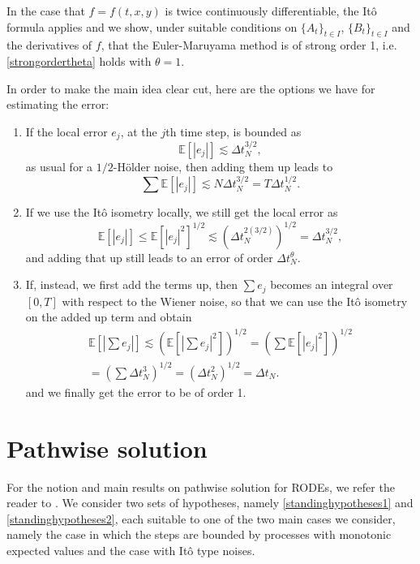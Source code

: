 \documentclass[reqno,12pt]{amsart}
\theoremstyle{plain}%
\theoremstyle{definition}
\begin{document}
In the case that $f=f(t, x, y)$ is twice continuously differentiable, the It\^o formula applies and we show, under suitable conditions on $\{A_t\}_{t\in I}$, $\{B_t\}_{t\in I}$ and the derivatives of $f$, that the Euler-Maruyama method is of strong order 1, i.e. \eqref{strongordertheta} holds with $\theta=1$.

In order to make the main idea clear cut, here are the options we have for estimating the error:
\begin{enumerate}
  \item If the local error $e_j$, at the $j$th time step, is bounded as
    $$
    \mathbb{E}[|e_j|] \lesssim \Delta t_N^{3/2},
    $$
    as usual for a $1/2$-H\"older noise, then adding them up leads to 
    $$
      \sum \mathbb{E}[|e_j|] \lesssim N\Delta t_N^{3/2} = T\Delta t_N^{1/2}.
    $$
    \item If we use the It\^o isometry locally, we still get the local error as
    $$
      \mathbb{E}[|e_j|] \leq \mathbb{E}[|e_j|^2]^{1/2} \lesssim \left(\Delta t_N^{2(3/2)} \right)^{1/2} = \Delta t_N^{3/2},
    $$
    and adding that up still leads to an error of order $\Delta t_N^{\theta}$.
    \item If, instead, we first add the terms up, then $\sum e_j$ becomes an integral over $[0, T]$ with respect to the Wiener noise, so that we can use the It\^o isometry on the added up term and obtain
    \begin{multline*}
      \mathbb{E}\left[ \left| \sum e_j \right| \right] \lesssim \left(\mathbb{E}\left[ \left| \sum e_j \right|^2 \right]\right)^{1/2} = \left( \sum \mathbb{E}[|e_j|^2] \right)^{1/2} \\
      = \left( \sum \Delta t_N^3 \right)^{1/2} = \left( \Delta t_N^2 \right)^{1/2} = \Delta t_N.
    \end{multline*}
    and we finally get the error to be of order 1.
\end{enumerate}

\section{Pathwise solution}
\label{secpathwisesolution}

For the notion and main results on pathwise solution for RODEs, we refer the reader to \cite[Section 2.1]{HanKloeden2017}. We consider two sets of hypotheses, namely \cref{standinghypotheses1} and \cref{standinghypotheses2}, each suitable to one of the two main cases we consider, namely the case in which the steps are bounded by processes with monotonic expected values and the case with It\^o type noises.
\end{document}
